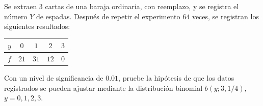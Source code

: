 \begin{enunciado}
 Se extraen 3 cartas de una baraja ordinaria, con reemplazo,
 y se registra el n\'umero $Y$ de espadas.
 Despu\'es de repetir el experimento $64$ veces, se registran
 los siguientes resultados:
 \begin{center}
  \begin{tabular}{c|cccc}
   $y$ & $0$ & $1$ & $2$ & $3$ \\
   \hline
   $f$ & $21$ & $31$ & $12$ & $0$
  \end{tabular}
 \end{center}
 Con un nivel de significancia de $0.01$, pruebe la hip\'otesis
 de que los datos registrados se pueden ajustar
 mediante la distribuci\'on binomial $b(y;3,1/4)$, $y=0,1,2,3$.
\end{enunciado}


